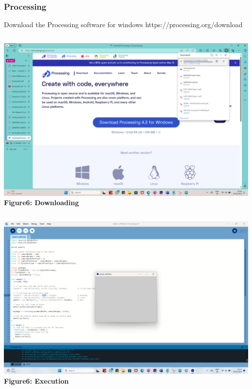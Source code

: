 \documentclass[10pt, a4paper]{beamer}
\begin{document}
	
	\begin{frame}
		\frametitle{Processing}
				Download the Processing software for windows
				https://processing.org/download 
				
					\begin{columns}
						\centering
						\includegraphics[width=\textwidth]{images/Download processing.png}
						\vspace{0.2cm}
						\textbf{Figure6: Downloading}
					\end{columns}
					
					\newpage
				
					\begin{columns}
						\column{0.5\textwidth}
						\centering
						\includegraphics[width=\textwidth]{images/Execution.png}
						\vspace{0.2cm}
						\textbf{Figure6: Execution}
					\end{columns}
	
	
	\end{frame}		
	
\end{document}

